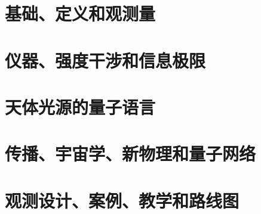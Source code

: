 \documentclass[cjk]{loom-book}
\begin{document}
\frontmatter


\makebookimagecover

\weave

{\small\tableofcontents}



\mainmatter
\part[基础、定义和观测量]{基础、定义和观测量}




\part[仪器、强度干涉和信息极限]{仪器、强度干涉和信息极限}




\part[天体光源的量子语言]{天体光源的量子语言}





\part[传播、宇宙学、新物理和量子网络]{传播、宇宙学、新物理和量子网络}




\part[观测设计、案例、教学和路线图]{观测设计、案例、教学和路线图}





\appendix








\backmatter


\end{document}
